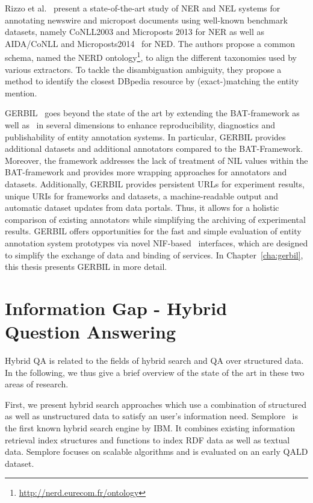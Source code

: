 Rizzo et al.~\cite{rizzo2014}  present a state-of-the-art study of NER and NEL systems for annotating newswire and micropost documents using well-known benchmark datasets, namely CoNLL2003 and Microposts 2013 for NER as well as AIDA/CoNLL and Microposts2014~\cite{Cano2014} for NED. 
The authors propose a common schema, named the NERD ontology\footnote{\url{http://nerd.eurecom.fr/ontology}}, to align the different taxonomies used by various extractors. To tackle the disambiguation ambiguity, they propose a method to identify the closest DBpedia resource by (exact-)matching the entity mention.

GERBIL~\cite{gerbil} goes beyond the state of the art by extending the BAT-framework as well as~\cite{rizzo2014} in several dimensions to enhance reproducibility, diagnostics and publishability of entity annotation systems. 
In particular, GERBIL provides \numberOfadditionalDatasets additional datasets and \numberOfadditionalAnnotators additional annotators compared to the BAT-Framework. 
Moreover, the framework addresses the lack of treatment of NIL values within the BAT-framework and provides more wrapping approaches for annotators and datasets. 
Additionally, GERBIL provides persistent URLs for experiment results, unique URIs for frameworks and datasets, a machine-readable output and automatic dataset updates from data portals. 
Thus, it allows for a holistic comparison of existing annotators while simplifying the archiving of experimental results. 
GERBIL offers opportunities for the fast and simple evaluation of entity annotation system prototypes via novel NIF-based~\cite{NIF} interfaces, which are designed to simplify the exchange of data and binding of services.
In Chapter~\ref{cha:gerbil}, this thesis presents GERBIL in more detail.

\section{Information Gap - Hybrid Question Answering}

Hybrid \ac{QA} is related to the fields of hybrid search and \ac{QA} over structured data. 
In the following, we thus give a brief overview of the state of the art in these two areas of research.

First, we present hybrid search approaches which use a combination of structured as well as unstructured data to satisfy an user's information need. 
Semplore~\cite{Zhang:2007a} is the first known hybrid search engine by IBM.
It combines existing information retrieval index structures and functions to index \ac{RDF} data as well as textual data. 
Semplore focuses on scalable algorithms and is evaluated on an early QALD dataset.

